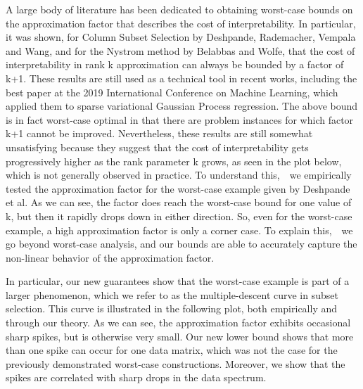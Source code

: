 \documentclass[11pt]{article}
\def\b{{~\textbullet~}}
\begin{document}
A large body of literature has been dedicated to obtaining worst-case
bounds on the approximation factor that describes the cost of
interpretability. In particular, it was shown, for 
Column Subset Selection by Deshpande, Rademacher, Vempala and Wang,
and for the Nystrom method by Belabbas and Wolfe, that the cost of
interpretability in rank k approximation can always be bounded by a
factor of k+1. These results are still used as a technical tool
in recent works, including the best paper at the 2019 International
Conference on Machine Learning, which
applied them to sparse variational Gaussian Process regression. The
above bound is in fact worst-case optimal in that there are problem
instances for which factor k+1 cannot be improved. Nevertheless, these
results are still somewhat unsatisfying because they suggest that the
cost of interpretability gets progressively higher as the rank
parameter k grows, as seen in the plot below, which is not generally
observed in practice. To understand this,\b we empirically tested the
approximation factor for the worst-case example given by Deshpande et
al. As we can see, the factor does reach the worst-case bound for one
value of k, but then it rapidly drops down in either direction. So,
even for the worst-case example, a high approximation factor is only a
corner case. To explain this,\b we go beyond worst-case analysis, and
our bounds are able to accurately capture the non-linear behavior of
the approximation factor. 

In particular, our new guarantees show that the worst-case example is
part of a larger phenomenon, which we refer to as the multiple-descent
curve in subset selection. This curve is illustrated in the
following plot, both empirically and through our theory. As we can
see, the approximation factor exhibits occasional sharp spikes, but is
otherwise very small.  Our new lower bound shows that more than one
spike can occur for one data matrix, which was not the case for the
previously demonstrated worst-case constructions. Moreover, we show
that the spikes are correlated with sharp drops in the data spectrum. 
\end{document}
